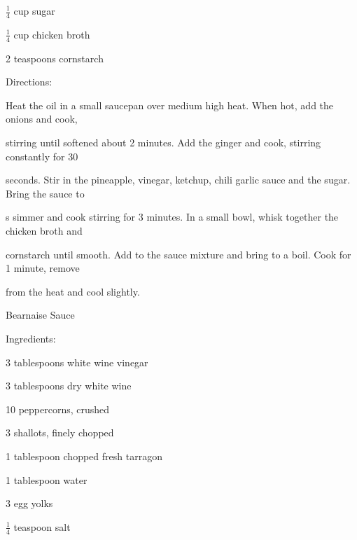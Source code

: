 \documentclass[a4paper,portrait,12pt]{book}
\begin{document}
$\frac{1}{4}$ cup sugar




$\frac{1}{4}$ cup chicken broth




2 teaspoons cornstarch




Directions:




Heat the oil in a small saucepan over medium high heat. When hot, add the onions and cook,




stirring until softened about 2 minutes. Add the ginger and cook, stirring constantly for 30




seconds. Stir in the pineapple, vinegar, ketchup, chili garlic sauce and the sugar. Bring the sauce to




s simmer and cook stirring for 3 minutes. In a small bowl, whisk together the chicken broth and




cornstarch until smooth. Add to the sauce mixture and bring to a boil. Cook for 1 minute, remove




from the heat and cool slightly.







\newpage
Bearnaise Sauce




Ingredients:




3 tablespoons white wine vinegar




3 tablespoons dry white wine




10 peppercorns, crushed




3 shallots, finely chopped




1 tablespoon chopped fresh tarragon




1 tablespoon water




3 egg yolks




$\frac{1}{4}$ teaspoon salt
\end{document}
